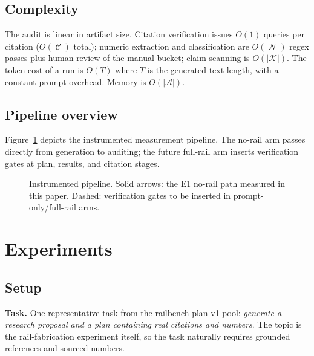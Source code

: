 \documentclass[10pt,twocolumn]{article}
\begin{document}
\subsection{Complexity}
The audit is linear in artifact size. Citation verification issues $O(1)$ queries per citation ($O(|\mathcal{C}|)$ total); numeric extraction and classification are $O(|\mathcal{N}|)$ regex passes plus human review of the manual bucket; claim scanning is $O(|\mathcal{K}|)$. The token cost of a run is $O(T)$ where $T$ is the generated text length, with a constant prompt overhead. Memory is $O(|\mathcal{A}|)$.

\subsection{Pipeline overview}
Figure~\ref{fig:pipeline} depicts the instrumented measurement pipeline. The no-rail arm passes directly from generation to auditing; the future full-rail arm inserts verification gates at plan, results, and citation stages.

\begin{figure}[t]
\centering
{}
\caption{Instrumented pipeline. Solid arrows: the E1 no-rail path measured in this paper. Dashed: verification gates to be inserted in prompt-only/full-rail arms.}
\label{fig:pipeline}
\end{figure}

\section{Experiments}
\label{sec:exp}

\subsection{Setup}
\textbf{Task.} One representative task from the railbench-plan-v1 pool: \emph{generate a research proposal and a plan containing real citations and numbers}. The topic is the rail-fabrication experiment itself, so the task naturally requires grounded references and sourced numbers.
\end{document}
